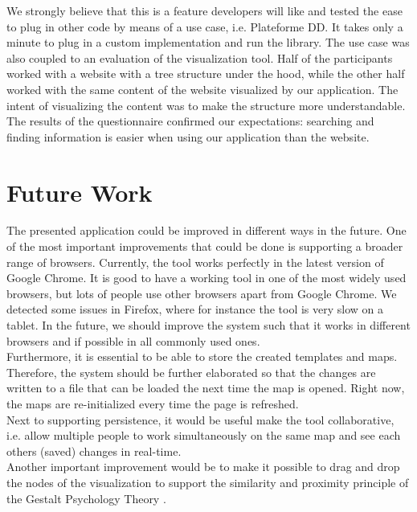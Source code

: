 We strongly believe that this is a feature developers will like and tested the ease to plug in other code by means of a use case, i.e. Plateforme DD. It takes only a minute to plug in a custom implementation and run the library. The use case was also coupled to an evaluation of the visualization tool. Half of the participants worked with a website with a tree structure under the hood, while the other half worked with the same content of the website visualized by our application. The intent of visualizing the content was to make the structure more understandable. The results of the questionnaire confirmed our expectations: searching and finding information is easier when using our application than the website.


\section{Future Work}\label{sec:future-work}

The presented application could be improved in different ways in the future. One of the most important improvements that could be done is supporting a broader range of browsers. Currently, the tool works perfectly in the latest version of Google Chrome. It is good to have a working tool in one of the most widely used browsers, but lots of people use other browsers apart from Google Chrome. We detected some issues in Firefox, where for instance the tool is very slow on a tablet. In the future, we should improve the system such that it works in different browsers and if possible in all commonly used ones.\\

Furthermore, it is essential to be able to store the created templates and maps. Therefore, the system should be further elaborated so that the changes are written to a file that can be loaded the next time the map is opened. Right now, the maps are re-initialized every time the page is refreshed.\\

Next to supporting persistence, it would be useful make the tool collaborative, i.e. allow multiple people to work simultaneously on the same map and see each others (saved) changes in real-time.\\

Another important improvement would be to make it possible to drag and drop the nodes of the visualization to support the similarity and proximity principle of the Gestalt Psychology Theory \citep{koffka2013principles}.\\
